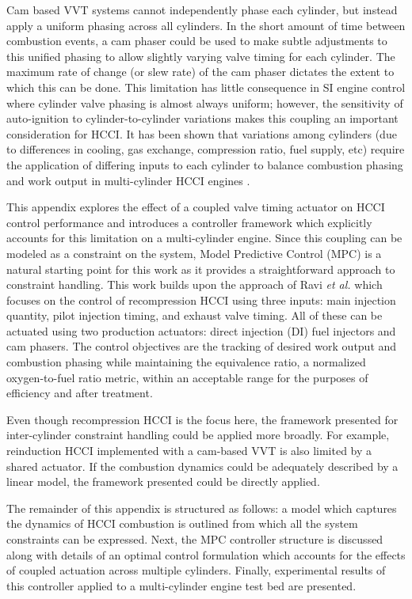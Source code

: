 Cam based VVT systems cannot independently phase each cylinder, but instead apply a uniform phasing across all cylinders. In the short amount of time between combustion events, a cam phaser could be used to make subtle adjustments to this unified phasing to allow slightly varying valve timing for each cylinder. The maximum rate of change (or slew rate) of the cam phaser dictates the extent to which this can be done. This limitation has little consequence in SI engine control where cylinder valve phasing is almost always uniform; however, the sensitivity of auto-ignition to cylinder-to-cylinder variations makes this coupling an important consideration for HCCI. It has been shown that variations among cylinders (due to differences in cooling, gas exchange, compression ratio, fuel supply, etc) require the application of differing inputs to each cylinder to balance combustion phasing and work output in multi-cylinder HCCI engines \cite{Hyvonen2004,Persson2005}.

This appendix explores the effect of a coupled valve timing actuator on HCCI control performance and introduces a controller framework which explicitly accounts for this limitation on a multi-cylinder engine. Since this coupling can be modeled as a constraint on the system, Model Predictive Control (MPC) is a natural starting point for this work as it provides a straightforward approach to constraint handling. This work builds upon the approach of Ravi \textit{et al.} \cite{Ravi2012} which focuses on the control of recompression HCCI using three inputs: main injection quantity, pilot injection timing, and exhaust valve timing. All of these can be actuated using two production actuators: direct injection (DI) fuel injectors and cam phasers. The control objectives are the tracking of desired work output and combustion phasing while maintaining the equivalence ratio, a normalized oxygen-to-fuel ratio metric, within an acceptable range for the purposes of efficiency and after treatment.

Even though recompression HCCI is the focus here, the framework presented for inter-cylinder constraint handling could be applied more broadly. For example, reinduction HCCI implemented with a cam-based VVT is also limited by a shared actuator. If the combustion dynamics could be adequately described by a linear model, the framework presented could be directly applied.

The remainder of this appendix is structured as follows: a model which captures the dynamics of HCCI combustion is outlined from which all the system constraints can be expressed. Next, the MPC controller structure is discussed along with details of an optimal control formulation which accounts for the effects of coupled actuation across multiple cylinders. Finally, experimental results of this controller applied to a multi-cylinder engine test bed are presented.
